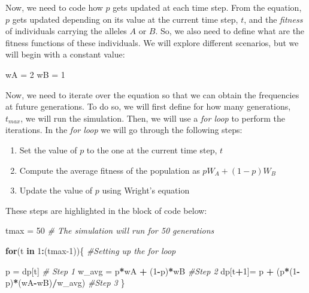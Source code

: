 \documentclass[
]{book}
\newenvironment{Shaded}{\begin{snugshade}}{\end{snugshade}}
\newcommand{\CommentTok}[1]{\textcolor[rgb]{0.56,0.35,0.01}{\textit{#1}}}
\newcommand{\ControlFlowTok}[1]{\textcolor[rgb]{0.13,0.29,0.53}{\textbf{#1}}}
\newcommand{\DecValTok}[1]{\textcolor[rgb]{0.00,0.00,0.81}{#1}}
\newcommand{\NormalTok}[1]{#1}
\newcommand{\OtherTok}[1]{\textcolor[rgb]{0.56,0.35,0.01}{#1}}
\newcommand{\SpecialCharTok}[1]{\textcolor[rgb]{0.81,0.36,0.00}{\textbf{#1}}}
\begin{document}
Now, we need to code how \(p\) gets updated at each time step. From the equation, \(p\) gets updated depending on its value at the current time step, \(t\), and the \emph{fitness} of individuals carrying the alleles \(A\) or \(B\). So, we also need to define what are the fitness functions of these individuals. We will explore different scenarios, but we will begin with a constant value:

\begin{Shaded}
\begin{Highlighting}[]
\NormalTok{wA }\OtherTok{=} \DecValTok{2}
\NormalTok{wB }\OtherTok{=} \DecValTok{1}
\end{Highlighting}
\end{Shaded}

Now, we need to iterate over the equation so that we can obtain the frequencies at future generations. To do so, we will first define for how many generations, \(t_{max}\), we will run the simulation. Then, we will use a \emph{for loop} to perform the iterations. In the \emph{for loop} we will go through the following steps:

\begin{enumerate}
\def\labelenumi{\arabic{enumi}.}
\item
  Set the value of \(p\) to the one at the current time step, \(t\)
\item
  Compute the average fitness of the population as \(pW_{A}+(1-p)W_{B}\)
\item
  Update the value of \(p\) using Wright's equation
\end{enumerate}

These steps are highlighted in the block of code below:

\begin{Shaded}
\begin{Highlighting}[]
\NormalTok{tmax }\OtherTok{=} \DecValTok{50} \CommentTok{\# The simulation will run for 50 generations}

\ControlFlowTok{for}\NormalTok{(t }\ControlFlowTok{in} \DecValTok{1}\SpecialCharTok{:}\NormalTok{(tmax}\DecValTok{{-}1}\NormalTok{))\{ }\CommentTok{\#Setting up the for loop}
  
\NormalTok{  p }\OtherTok{=}\NormalTok{ dp[t] }\CommentTok{\# Step 1}
\NormalTok{  w\_avg }\OtherTok{=}\NormalTok{ p}\SpecialCharTok{*}\NormalTok{wA }\SpecialCharTok{+}\NormalTok{ (}\DecValTok{1}\SpecialCharTok{{-}}\NormalTok{p)}\SpecialCharTok{*}\NormalTok{wB }\CommentTok{\#Step 2}
\NormalTok{  dp[t}\SpecialCharTok{+}\DecValTok{1}\NormalTok{]}\OtherTok{=}\NormalTok{ p }\SpecialCharTok{+}\NormalTok{ (p}\SpecialCharTok{*}\NormalTok{(}\DecValTok{1}\SpecialCharTok{{-}}\NormalTok{p)}\SpecialCharTok{*}\NormalTok{(wA}\SpecialCharTok{{-}}\NormalTok{wB)}\SpecialCharTok{/}\NormalTok{w\_avg) }\CommentTok{\#Step 3}
\NormalTok{\}}
\end{Highlighting}
\end{Shaded}
\end{document}
